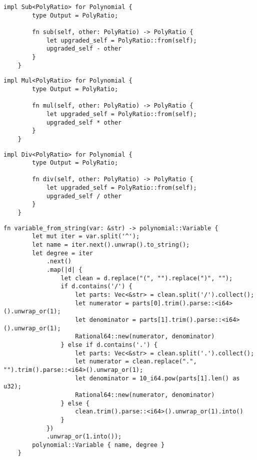 \begin{lstlisting}[caption={The implementation of the subtraction operation between \texttt{Polynomial} and \texttt{PolyRatio}}, label={lst:polyratio-polynomial-sub}]
    impl Sub<PolyRatio> for Polynomial {
        type Output = PolyRatio;
    
        fn sub(self, other: PolyRatio) -> PolyRatio {
            let upgraded_self = PolyRatio::from(self);
            upgraded_self - other
        }
    }
\end{lstlisting}

\begin{lstlisting}[caption={The implementation of the multiplication operation between \texttt{Polynomial} and \texttt{PolyRatio}}, label={lst:polyratio-polynomial-mul}]
    impl Mul<PolyRatio> for Polynomial {
        type Output = PolyRatio;
    
        fn mul(self, other: PolyRatio) -> PolyRatio {
            let upgraded_self = PolyRatio::from(self);
            upgraded_self * other
        }
    }
\end{lstlisting}

\begin{lstlisting}[caption={The implementation of the division operation between \texttt{Polynomial} and \texttt{PolyRatio}}, label={lst:polyratio-polynomial-div}]
    impl Div<PolyRatio> for Polynomial {
        type Output = PolyRatio;
    
        fn div(self, other: PolyRatio) -> PolyRatio {
            let upgraded_self = PolyRatio::from(self);
            upgraded_self / other
        }
    }
\end{lstlisting}

\begin{lstlisting}[caption={The implementation of the \texttt{variable\_from\_string()} function}, label={lst:variable-from-string}]
    fn variable_from_string(var: &str) -> polynomial::Variable {
        let mut iter = var.split('^');
        let name = iter.next().unwrap().to_string();
        let degree = iter
            .next()
            .map(|d| {
                let clean = d.replace("(", "").replace(")", "");
                if d.contains('/') {
                    let parts: Vec<&str> = clean.split('/').collect();
                    let numerator = parts[0].trim().parse::<i64>().unwrap_or(1);
                    let denominator = parts[1].trim().parse::<i64>().unwrap_or(1);
                    Rational64::new(numerator, denominator)
                } else if d.contains('.') {
                    let parts: Vec<&str> = clean.split('.').collect();
                    let numerator = clean.replace(".", "").trim().parse::<i64>().unwrap_or(1);
                    let denominator = 10_i64.pow(parts[1].len() as u32);
                    Rational64::new(numerator, denominator)
                } else {
                    clean.trim().parse::<i64>().unwrap_or(1).into()
                }
            })
            .unwrap_or(1.into());
        polynomial::Variable { name, degree }
    }
\end{lstlisting}

